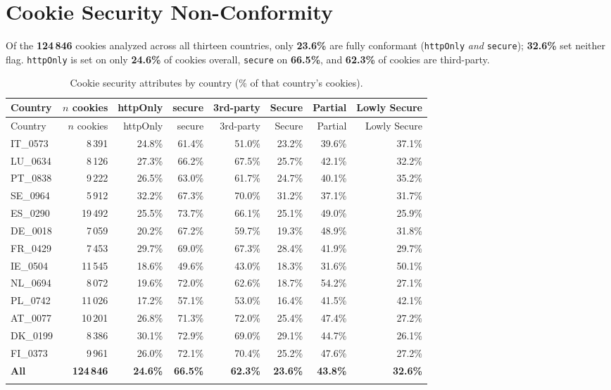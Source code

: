 \documentclass[11pt,a4paper]{article}
\newcommand{\code}[1]{\texttt{#1}}
\begin{document}
\section{Cookie Security Non-Conformity}

Of the \textbf{124\,846} cookies analyzed across all thirteen countries, only
\textbf{23.6\%} are fully conformant (\code{httpOnly} \emph{and}
\code{secure}); \textbf{32.6\%} set neither flag. \code{httpOnly} is set on
only \textbf{24.6\%} of cookies overall, \code{secure} on
\textbf{66.5\%}, and \textbf{62.3\%} of cookies are third-party.

\begingroup\footnotesize\setlength{\tabcolsep}{4pt}
\begin{longtable}{lrrrrrrr}
\caption{Cookie security attributes by country (\% of that country's cookies).}\label{tab:security}\\
\toprule
Country & $n$ cookies & httpOnly & secure & 3rd-party & Secure & Partial & Lowly Secure \\
\midrule
\endfirsthead
\toprule
Country & $n$ cookies & httpOnly & secure & 3rd-party & Secure & Partial & Lowly Secure \\
\midrule
\endhead
IT\_0573 & 8\,391 & 24.8\% & 61.4\% & 51.0\% & 23.2\% & 39.6\% & 37.1\% \\
LU\_0634 & 8\,126 & 27.3\% & 66.2\% & 67.5\% & 25.7\% & 42.1\% & 32.2\% \\
PT\_0838 & 9\,222 & 26.5\% & 63.0\% & 61.7\% & 24.7\% & 40.1\% & 35.2\% \\
SE\_0964 & 5\,912 & 32.2\% & 67.3\% & 70.0\% & 31.2\% & 37.1\% & 31.7\% \\
ES\_0290 & 19\,492 & 25.5\% & 73.7\% & 66.1\% & 25.1\% & 49.0\% & 25.9\% \\
DE\_0018 & 7\,059 & 20.2\% & 67.2\% & 59.7\% & 19.3\% & 48.9\% & 31.8\% \\
FR\_0429 & 7\,453 & 29.7\% & 69.0\% & 67.3\% & 28.4\% & 41.9\% & 29.7\% \\
IE\_0504 & 11\,545 & 18.6\% & 49.6\% & 43.0\% & 18.3\% & 31.6\% & 50.1\% \\
NL\_0694 & 8\,072 & 19.6\% & 72.0\% & 62.6\% & 18.7\% & 54.2\% & 27.1\% \\
PL\_0742 & 11\,026 & 17.2\% & 57.1\% & 53.0\% & 16.4\% & 41.5\% & 42.1\% \\
AT\_0077 & 10\,201 & 26.8\% & 71.3\% & 72.0\% & 25.4\% & 47.4\% & 27.2\% \\
DK\_0199 & 8\,386 & 30.1\% & 72.9\% & 69.0\% & 29.1\% & 44.7\% & 26.1\% \\
FI\_0373 & 9\,961 & 26.0\% & 72.1\% & 70.4\% & 25.2\% & 47.6\% & 27.2\% \\
\midrule
\textbf{All} & \textbf{124\,846} & \textbf{24.6\%} & \textbf{66.5\%} & \textbf{62.3\%} & \textbf{23.6\%} & \textbf{43.8\%} & \textbf{32.6\%} \\\\
\bottomrule
\end{longtable}
\endgroup
\end{document}
